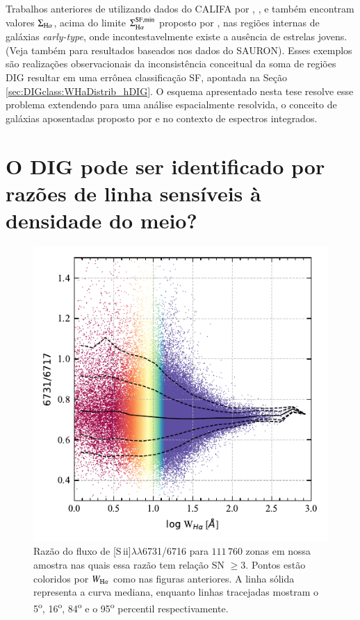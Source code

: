 Trabalhos anteriores de utilizando dados do CALIFA por \citet{Kehrig.etal.2012}, \citet{Singh.etal.2013}, e \citet{Gomes.etal.2016b} também encontram valores $\Sigma_{\Ha}$, acima do limite $\Sigma^{\rm SF,min}_{\Ha}$ proposto por \citet{Zhang.etal.2017a}, nas regiões internas de galáxias {\em early-type}, onde incontestavelmente existe a ausência de estrelas jovens. (Veja também \citealt{Sarzi.etal.2010} para resultados baseados nos dados do SAURON). Esses exemplos são realizações observacionais da inconsistência conceitual da soma de regiões DIG resultar em uma errônea classificação SF, apontada na Seção \ref{sec:DIGclass:WHaDistrib_hDIG}. O esquema apresentado nesta tese resolve esse problema extendendo para uma análise espacialmente resolvida, o conceito de galáxias aposentadas proposto por \citet{Stasinska.etal.2008a} e \citet{CidFernandes.etal.2011a} no contexto de espectros integrados.


\section{O DIG pode ser identificado por razões de linha sensíveis à densidade do meio?}
\label{sec:DIGdisc:nSii}

\begin{figure}
 \includegraphics[scale=1.3]{figuras/fig_SII_logWHa_SNR3.pdf}
 \caption[$\log$ \sii$\times \log W_{{\rm H}\alpha}$]
 {Razão do fluxo de [S\,{\sc ii}]$\lambda\lambda$6731/6716 para $111\,760$ zonas em nossa amostra nas quais essa razão tem relação SN $\ge 3$. Pontos estão coloridos por $W_{\Ha}$ como nas figuras anteriores. A linha sólida representa a curva mediana, enquanto linhas tracejadas mostram o 5\textsuperscript{o}, 16\textsuperscript{o}, 84\textsuperscript{o} e o 95\textsuperscript{o} percentil respectivamente.}
 \label{fig:S2_WHa}
\end{figure}

